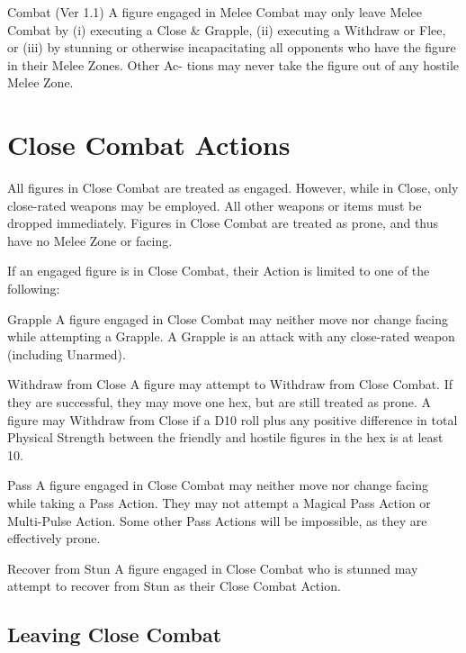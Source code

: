 \begin{Chapter}{Combat (Ver 1.1)}
A figure engaged in Melee Combat may only leave Melee Combat by (i)
executing a Close \& Grapple, (ii) executing a Withdraw or Flee, or
(iii) by stunning or otherwise incapacitating all opponents who have
the figure in their Melee Zones.  Other Ac- tions may never take the
figure out of any hostile Melee Zone.

\section{Close Combat Actions}

All figures in Close Combat are treated as engaged.  However, while in
Close, only close-rated weapons may be employed. All other weapons or
items must be dropped immediately. Figures in Close Combat are treated
as prone, and thus have no Melee Zone or facing.

If an engaged figure is in Close Combat, their Action is limited to
one of the following:

\begin{Description}

\item[Grapple] A figure engaged in Close Combat may neither move nor
  change facing while attempting a Grapple.  A Grapple is an attack
  with any close-rated weapon (including Unarmed).

\item[Withdraw from Close] A figure may attempt to Withdraw from Close
  Combat. If they are successful, they may move one hex, but are still
  treated as prone.  A figure may Withdraw from Close if a D10 roll
  plus any positive difference in total Physical Strength between the
  friendly and hostile figures in the hex is at least 10.

\item[Pass] A figure engaged in Close Combat may neither move nor
  change facing while taking a Pass Action.  They may not attempt a
  Magical Pass Action or Multi-Pulse Action.  Some other Pass Actions
  will be impossible, as they are effectively prone.

\item[Recover from Stun] A figure engaged in Close Combat who is
  stunned may attempt to recover from Stun as their Close Combat
  Action.

\end{Description}

\subsection{Leaving Close Combat}


\end{Chapter}
